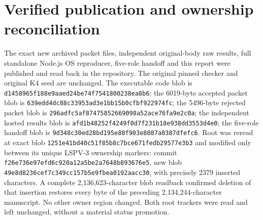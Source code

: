 \documentclass[11pt]{article}
\begin{document}
\section{Verified publication and ownership reconciliation}
The exact new archived packet files, independent original-body raw results, full standalone Node.js OS reproducer, five-role handoff and this report were published and read back in the repository. The original pinned checker and original K4 seed are unchanged. The executable code blob is \texttt{d1458965f188e9aaed24be74f7541800238ea8b6}; the 6019-byte accepted packet blob is \texttt{639edd4dc88c33953ad3e1bb15b0cfbf922974fc}; the 5496-byte rejected packet blob is \texttt{296adfc5af87475852669098a52ace76fa9e2c0a}; the independent hosted results blob is \texttt{afd1b48252f4249f0d7f231b18e938dd3553d4e0}; the five-role handoff blob is \texttt{9d348c30ed28bd195e88f903e8087a0387dfefc6}. Root  was reread at exact blob \texttt{1251e41bd40c51f85b8c7bce671fedb29577e3b3} and modified only between its unique LSPV-3 ownership markers: commit \texttt{f26e736e97efd6c920a12a5be2a7648b893676e5}, new blob \texttt{49e8d8236cef7c349cc157b5e9fbea0192aacc30}, with precisely 2379 inserted characters. A complete 2,136,623-character blob readback confirmed deletion of that insertion restores every byte of the preceding 2,134,244-character manuscript. No other owner region changed. Both root trackers were read and left unchanged, without a material status promotion.
\end{document}
